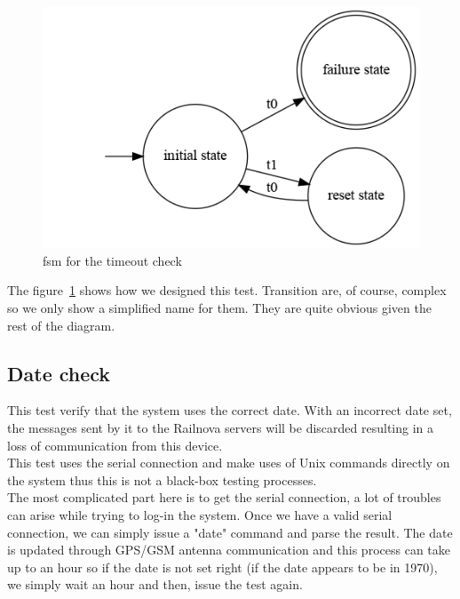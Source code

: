 \documentclass[12pt]{article}
\theoremstyle{definition}
\theoremstyle{definition}
\theoremstyle{remark}
\begin{document}
\begin{figure}
    \centering
    \includegraphics[scale=0.6]{graph/TimeoutCheck}
    \caption{\gls{fsm} for the timeout check}
    \label{timeoutcheck}
\end{figure}

The figure~\ref{timeoutcheck} shows how we designed this test. Transition are, of course, complex so we only show a simplified name for them. They are quite obvious given the rest of the diagram.


\subsection{Date check}

This test verify that the system uses the correct date. With an incorrect date set, the messages sent by it to the Railnova servers will be discarded resulting in a loss of communication from this device.\\

This test uses the serial connection and make uses of Unix commands directly on the system thus this is not a black-box testing processes.\\

The most complicated part here is to get the serial connection, a lot of troubles can arise while trying to log-in the system. Once we have a valid serial connection, we can simply issue a "date" command and parse the result. The date is updated through GPS/GSM antenna communication and this process can take up to an hour so if the date is not set right (if the date appears to be in 1970), we simply wait an hour and then, issue the test again.\\
\end{document}

